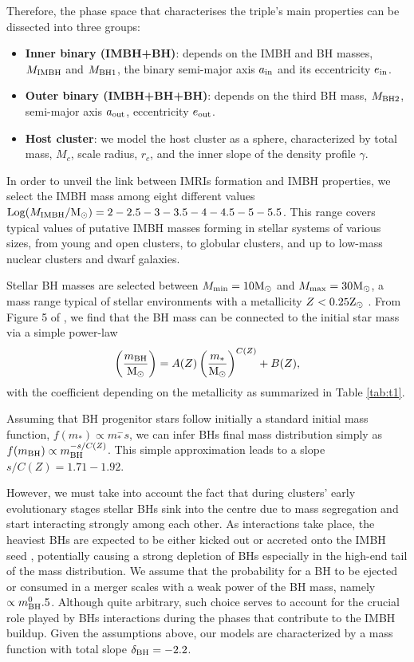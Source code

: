 \documentclass[useAMS,usenatbib]{mn2e}
\newcommand{\Ms}{{\rm M}_\odot}
\newcommand{\Zs}{{\rm Z}_\odot}
\newcommand{\ibh}{{\rm IMBH}}
\newcommand{\inn}{{\rm in}}
\newcommand{\out}{{\rm out}}
\newcommand{\bh}{{\rm BH}}
\newcommand{\bhu}{{\rm BH1}}
\newcommand{\bhd}{{\rm BH2}}
\begin{document}
Therefore, the phase space that characterises the triple's main properties can be dissected into three groups:
\begin{itemize}
    \item {\bf Inner binary (IMBH+BH)}: depends on the IMBH and BH masses, $M_\ibh$ and $M_\bhu$, the binary semi-major axis $a_\inn$ and its eccentricity $e_\inn$.
    \item {\bf Outer binary (IMBH+BH+BH)}: depends on the third BH mass, $M_\bhd$, semi-major axis $a_\out$, eccentricity $e_\out$.
    \item {\bf Host cluster}: we model the host cluster as a \cite{Deh93} sphere, characterized by total mass, $M_c$, scale radius, $r_c$, and the inner slope of the density profile $\gamma$.
\end{itemize}

In order to unveil the link between IMRIs formation and IMBH properties, we select the IMBH mass among eight different values ${\rm Log}(M_\ibh/\Ms) = 2-2.5-3-3.5-4-4.5-5-5.5$. This range covers typical values of putative IMBH masses forming in stellar systems of various sizes, from young and open clusters, to globular clusters, and up to low-mass nuclear clusters and dwarf galaxies.

Stellar BH masses are selected between $M_{\rm min} = 10\Ms$ and $M_{\rm max} = 30\Ms$, a mass range typical of stellar environments with a metallicity $Z<0.25\Zs$ \citep{belczynski16,spera16}. 
From Figure 5 of \cite{belczynski16}, we find that the BH mass can be connected to the initial star mass via a simple power-law 
\begin{equation}
\left(\frac{m_\bh}{\Ms}\right) = A(Z) \left(\frac{m_*}{\Ms}\right)^{C(Z)} + B(Z),
\end{equation}
with the coefficient depending on the metallicity as summarized in Table \ref{tab:t1}.

Assuming that BH progenitor stars follow initially a standard \cite{kroupa01} initial mass function, $f(m_*) \propto m_*^-s$, we can infer BHs final mass distribution simply as $f(m_\bh)\propto m_\bh^{-s/C(Z)}$. This simple approximation leads to a slope $s/C(Z) = 1.71-1.92$. 

However, we must take into account the fact that during clusters' early evolutionary stages stellar BHs sink into the centre due to mass segregation and start interacting strongly among each other.
As interactions take place, the heaviest BHs are expected to be either kicked out or accreted onto the IMBH seed \citep{giersz15,AAG18a}, potentially causing a strong depletion of BHs especially in the high-end tail of the mass distribution. We assume that the probability for a BH to be ejected or consumed in a merger scales with a weak power of the BH mass, namely $ \propto m_\bh^0.5$. Although quite arbitrary, such choice serves to account for the crucial role played by BHs interactions during the phases that contribute to the IMBH buildup. Given the assumptions above, our models are characterized by a mass function with total slope $\delta_\bh = -2.2$.
\end{document}
